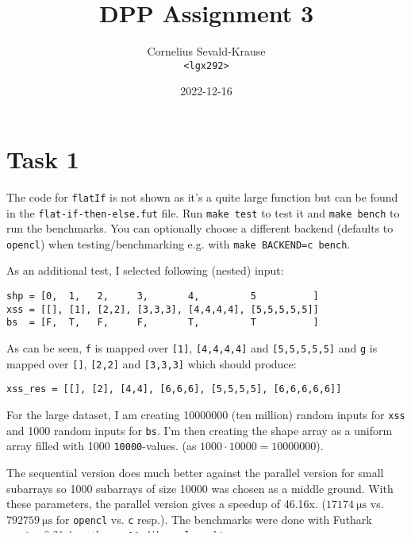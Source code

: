 \documentclass{article}
\begin{document}
\title{DPP Assignment 3}
\author{Cornelius Sevald-Krause \\ \texttt{<lgx292>}}
\date{2022-12-16}
\maketitle

\section*{Task 1}

The code for \verb|flatIf| is not shown as it's a quite large function but can
be found in the \verb|flat-if-then-else.fut| file. Run \verb|make test| to test
it and \verb|make bench| to run the benchmarks. You can optionally choose a
different backend (defaults to \verb|opencl|) when testing/benchmarking e.g.
with \verb|make BACKEND=c bench|.

As an additional test, I selected following (nested) input:
\begin{Verbatim}
shp = [0,  1,   2,     3,       4,         5          ]
xss = [[], [1], [2,2], [3,3,3], [4,4,4,4], [5,5,5,5,5]]
bs  = [F,  T,   F,     F,       T,         T          ]
\end{Verbatim}
As can be seen, \verb|f| is mapped over \verb|[1]|, \verb|[4,4,4,4]| and
\verb|[5,5,5,5,5]| and \verb|g| is mapped over \verb|[]|, \verb|[2,2]| and
\verb|[3,3,3]| which should produce:
\begin{Verbatim}
xss_res = [[], [2], [4,4], [6,6,6], [5,5,5,5], [6,6,6,6,6]]
\end{Verbatim}

For the large dataset, I am creating \num{10000000} (ten million) random inputs
for \verb|xss| and \num{1000} random inputs for \verb|bs|. I'm then creating
the shape array as a uniform array filled with \num{1000} \verb|10000|-values.
(as $\num{1000} \cdot \num{10000} = \num{10000000}$).

The sequential version does much better against the parallel version for small
subarrays so \num{1000} subarrays of size \num{10000} was chosen as a middle
ground. With these parameters, the parallel version gives a speedup of
\textapprox 46.16x. ($\qty{17174}{\micro\second}$ vs.
$\qty{792759}{\micro\second}$ for \verb|opencl| vs. \verb|c| resp.). The
benchmarks were done with Futhark version 0.21.4 on the \verb|gpu04-diku-apl|
machine.

\section*{Task 2}
\end{document}

